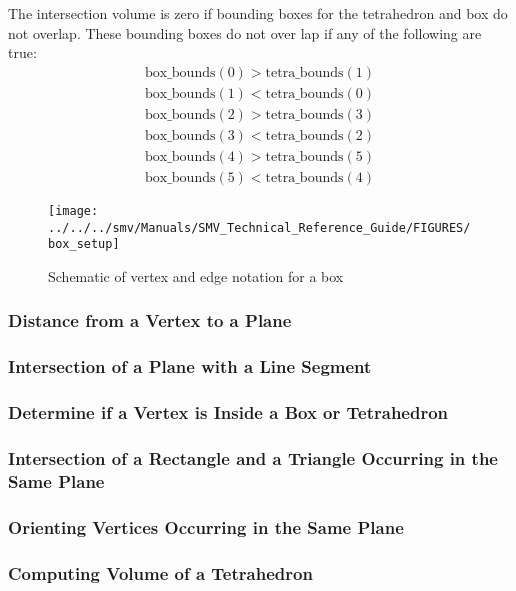 \documentclass[12pt]{article}
\begin{document}
\noindent The intersection volume is zero if bounding boxes for the tetrahedron and box do not overlap.
These bounding boxes do not over lap if any of the following are true:
\begin{eqnarray*}
\mbox{box\_bounds}(0)>\mbox{tetra\_bounds}(1) \\
\mbox{box\_bounds}(1)<\mbox{tetra\_bounds}(0) \\
\mbox{box\_bounds}(2)>\mbox{tetra\_bounds}(3) \\
\mbox{box\_bounds}(3)<\mbox{tetra\_bounds}(2) \\
\mbox{box\_bounds}(4)>\mbox{tetra\_bounds}(5) \\
\mbox{box\_bounds}(5)<\mbox{tetra\_bounds}(4)
\end{eqnarray*}

\begin{figure}
\begin{center}
\texttt{[image: ../../../smv/Manuals/SMV\_Technical\_Reference\_Guide/FIGURES/box\_setup]}
\end{center}
\caption{Schematic of vertex and edge notation for a box}
\label{figure:box_setup}
\end{figure}

\subsubsection{Distance from a Vertex to a Plane}
\subsubsection{Intersection of a Plane with a Line Segment}
\subsubsection{Determine if a Vertex is Inside a Box or Tetrahedron}
\subsubsection{Intersection of a Rectangle and a Triangle Occurring in the Same Plane}
\subsubsection{Orienting Vertices Occurring in the Same Plane}
\subsubsection{Computing Volume of a Tetrahedron}
\end{document}

